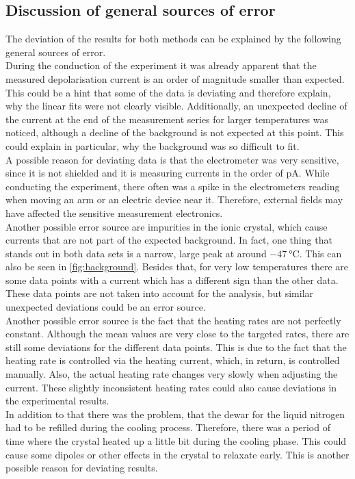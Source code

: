 \subsection{Discussion of general sources of error}
The deviation of the results for both methods can be explained by the following general sources of error.
\\
During the conduction of the experiment it was already apparent that the measured depolarisation current is an order of magnitude smaller than expected. 
This could be a hint that some of the data is deviating and therefore explain, why the linear fits were not clearly visible. 
Additionally, an unexpected decline of the current at the end of the measurement series for larger temperatures was noticed, although a decline of the background is not expected at this point. 
This could explain in particular, why the background was so difficult to fit. 
\\
A possible reason for deviating data is that the electrometer was very sensitive, since it is not shielded and it is measuring currents in the order of $\unit{\pico\ampere}$.
While conducting the experiment, there often was a spike in the electrometers reading when moving an arm or an electric device near it. 
Therefore, external fields may have affected the sensitive measurement electronics.
\\
Another possible error source are impurities in the ionic crystal, which cause currents that are not part of the expected background. 
In fact, one thing that stands out in both data sets is a narrow, large peak at around $-\qty{47}{\celsius}$. 
This can also be seen in \autoref{fig:background}.
Besides that, for very low temperatures there are some data points with a current which has a different sign than the other data. 
These data points are not taken into account for the analysis, but similar unexpected deviations could be an error source. 
\\
Another possible error source is the fact that the heating rates are not perfectly constant. 
Although the mean values are very close to the targeted rates, there are still some deviations for the different data points. 
This is due to the fact that the heating rate is controlled via the heating current, which, in return, is controlled manually. 
Also, the actual heating rate changes very slowly when adjusting the current. 
These slightly inconsistent heating rates could also cause deviations in the experimental results. 
\\
In addition to that there was the problem, that the dewar for the liquid nitrogen had to be refilled during the cooling process. 
Therefore, there was a period of time where the crystal heated up a little bit during the cooling phase. 
This could cause some dipoles or other effects in the crystal to relaxate early. 
This is another possible reason for deviating results. 

